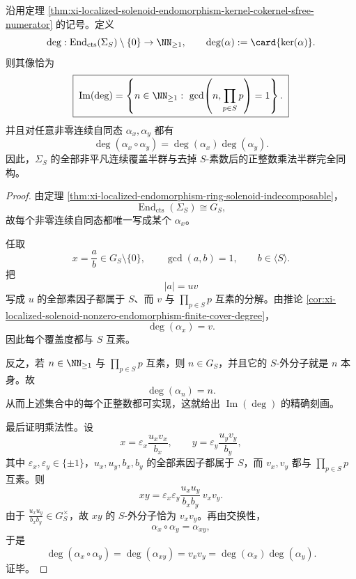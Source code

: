 \begin{corollary}[非零连续自同态覆盖度半群的严格算术分类]\label{cor:xi-localized-solenoid-nonzero-endomorphism-degree-semigroup}
沿用定理 \ref{thm:xi-localized-solenoid-endomorphism-kernel-cokernel-sfree-numerator} 的记号。定义
\[
\deg:\operatorname{End}_{\mathrm{cts}}(\Sigma_S)\setminus\{0\}\to \NN_{\ge 1},
\qquad
\deg(\alpha):=\card{\ker(\alpha)}.
\]
则其像恰为
\[
\boxed{\;
\operatorname{Im}(\deg)
=
\left\{
n\in \NN_{\ge 1}:\ \gcd\!\left(n,\prod_{p\in S}p\right)=1
\right\}.\;}
\]
并且对任意非零连续自同态 \(\alpha_x,\alpha_y\) 都有
\[
\boxed{\;
\deg(\alpha_x\circ \alpha_y)=\deg(\alpha_x)\deg(\alpha_y).\;}
\]
因此，\(\Sigma_S\) 的全部非平凡连续覆盖半群与去掉 \(S\)-素数后的正整数乘法半群完全同构。
\end{corollary}
\begin{proof}
由定理 \ref{thm:xi-localized-endomorphism-ring-solenoid-indecomposable}，
\[
\operatorname{End}_{\mathrm{cts}}(\Sigma_S)\cong G_S,
\]
故每个非零连续自同态都唯一写成某个 \(\alpha_x\)。

任取
\[
x=\frac{a}{b}\in G_S\setminus\{0\},
\qquad
\gcd(a,b)=1,
\qquad
b\in \langle S\rangle.
\]
把
\[
|a|=uv
\]
写成 \(u\) 的全部素因子都属于 \(S\)、而 \(v\) 与 \(\prod_{p\in S}p\) 互素的分解。由推论 \ref{cor:xi-localized-solenoid-nonzero-endomorphism-finite-cover-degree}，
\[
\deg(\alpha_x)=v.
\]
因此每个覆盖度都与 \(S\) 互素。

反之，若 \(n\in\NN_{\ge1}\) 与 \(\prod_{p\in S}p\) 互素，则 \(n\in G_S\)，并且它的 \(S\)-外分子就是 \(n\) 本身。故
\[
\deg(\alpha_n)=n.
\]
从而上述集合中的每个正整数都可实现，这就给出 \(\operatorname{Im}(\deg)\) 的精确刻画。

最后证明乘法性。设
\[
x=\varepsilon_x\frac{u_xv_x}{b_x},
\qquad
y=\varepsilon_y\frac{u_yv_y}{b_y},
\]
其中 \(\varepsilon_x,\varepsilon_y\in\{\pm1\}\)，\(u_x,u_y,b_x,b_y\) 的全部素因子都属于 \(S\)，而 \(v_x,v_y\) 都与 \(\prod_{p\in S}p\) 互素。则
\[
xy=\varepsilon_x\varepsilon_y\frac{u_xu_y}{b_xb_y}\,v_xv_y.
\]
由于 \(\frac{u_xu_y}{b_xb_y}\in G_S^\times\)，故 \(xy\) 的 \(S\)-外分子恰为 \(v_xv_y\)。再由交换性，
\[
\alpha_x\circ \alpha_y=\alpha_{xy},
\]
于是
\[
\deg(\alpha_x\circ \alpha_y)
=
\deg(\alpha_{xy})
=
v_xv_y
=
\deg(\alpha_x)\deg(\alpha_y).
\]
证毕。
\end{proof}

\endinput
